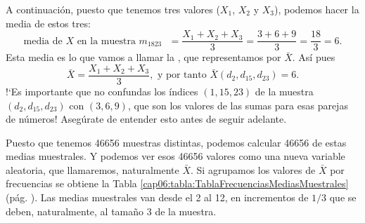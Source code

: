 \begin{ejemplo}
        A continuación, puesto que tenemos tres valores ($X_1$, $X_2$ y  $X_3$), podemos hacer la media de estos tres:
        \[\mbox{media de $X$ en la muestra $m_{1823}$ }=\dfrac{X_1+X_2+X_3}{3}=\dfrac{3+6+9}{3}=\dfrac{18}{3}=6.\]
        Esta media es lo que vamos a llamar la , que representamos por $\bar X$. Así pues
        \[\bar X=\dfrac{X_1+X_2+X_3}{3},\mbox{ y por tanto }\bar X(d_2,d_{15},d_{23})=6.\]
        {!`}Es importante que no confundas los índices $(1,15,23)$ de la muestra $(d_2,d_{15},d_{23})$
        con $(3,6,9)$, que son los valores de las sumas para esas parejas de números! Asegúrate de entender esto antes de seguir adelante.

        Puesto que tenemos 46656 muestras distintas, podemos calcular 46656 de estas medias muestrales. Y podemos ver esos 46656 valores como una nueva variable aleatoria, que llamaremos, naturalmente $\bar X$. Si agrupamos los valores de $\bar X$ por frecuencias se obtiene la Tabla \ref{cap06:tabla:TablaFrecuenciasMediasMuestrales} (pág. \pageref{cap06:tabla:TablaFrecuenciasMediasMuestrales}). Las medias muestrales van desde el 2 al 12, en incrementos de $1/3$ que se deben, naturalmente, al tamaño 3 de la muestra.


\end{ejemplo}
